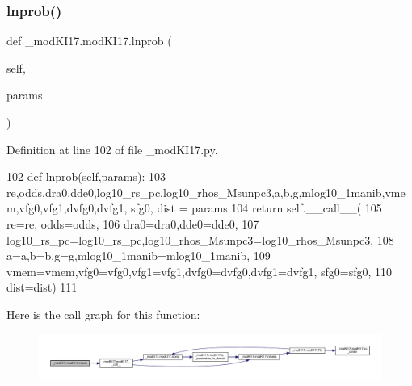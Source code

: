 \mbox{\label{class__modKI17_1_1modKI17_ab6a04521593f55b09af923b15a60051c}} 
\subsubsection{\texorpdfstring{lnprob()}{lnprob()}}
{\footnotesize\ttfamily def \+\_\+mod\+K\+I17.\+mod\+K\+I17.\+lnprob (\begin{DoxyParamCaption}\item[{}]{self,  }\item[{}]{params }\end{DoxyParamCaption})}



Definition at line 102 of file \+\_\+mod\+K\+I17.\+py.


\begin{DoxyCode}
102     \textcolor{keyword}{def }lnprob(self,params):
103         re,odds,dra0,dde0,log10\_rs\_pc,log10\_rhos\_Msunpc3,a,b,g,mlog10\_1manib,vmem,vfg0,vfg1,dvfg0,dvfg1, 
      sfg0, dist = params
104         \textcolor{keywordflow}{return} self.\_\_call\_\_(
105             re=re, odds=odds,
106             dra0=dra0,dde0=dde0,
107             log10\_rs\_pc=log10\_rs\_pc,log10\_rhos\_Msunpc3=log10\_rhos\_Msunpc3,
108             a=a,b=b,g=g,mlog10\_1manib=mlog10\_1manib,
109             vmem=vmem,vfg0=vfg0,vfg1=vfg1,dvfg0=dvfg0,dvfg1=dvfg1, sfg0=sfg0, 
110             dist=dist)
111     
\end{DoxyCode}
Here is the call graph for this function\+:\nopagebreak
\begin{figure}[H]
\begin{center}
\leavevmode
\includegraphics[width=350pt]{d8/d2c/class__modKI17_1_1modKI17_ab6a04521593f55b09af923b15a60051c_cgraph}
\end{center}
\end{figure}
\mbox{\label{class__modKI17_1_1modKI17_ae2d06ad8467b3c3ba9bcee127044fe53}} 
